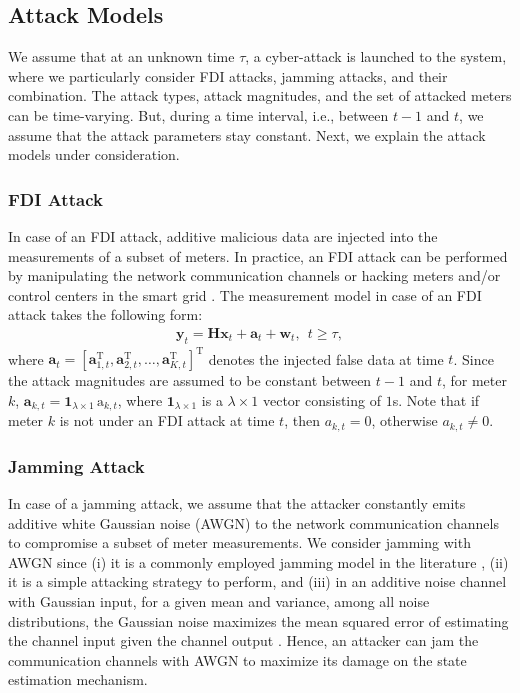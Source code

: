 \documentclass[onecolumn]{IEEEtran}
\begin{document}
\subsection{Attack Models}

We assume that at an unknown time $\tau$, a cyber-attack is launched to the system, where we particularly consider FDI attacks, jamming attacks, and their combination. The attack types, attack magnitudes, and the set of attacked meters can be time-varying. But, during a time interval, i.e., between $t-1$ and $t$, we assume that the attack parameters stay constant. Next, we explain the attack models under consideration.

\subsubsection{FDI Attack}

In case of an FDI attack, additive malicious data are injected into the measurements of a subset of meters. In practice, an FDI attack can be performed by manipulating the network communication channels or hacking meters and/or control centers in the smart grid \cite{Liang16,GLiang17}. The measurement model in case of an FDI attack takes the following form:
\begin{gather} \label{eq:fdi_model}
\mathbf{y}_t = \mathbf{H} \mathbf{x}_t + \mathbf{a}_t + \mathbf{w}_t, ~~ t \geq \tau,
\end{gather}
where $\mathbf{a}_t = [\mathbf{a}_{1,t}^\mathrm{T}, \mathbf{a}_{2,t}^\mathrm{T}, \dots, \mathbf{a}_{K,t}^\mathrm{T}]^\mathrm{T}$ denotes the injected false data at time $t$. Since the attack magnitudes are assumed to be constant between $t-1$ and $t$, for meter $k$, $\mathbf{a}_{k,t} = \mathbf{1}_{\lambda \times 1} \, \mathrm{a}_{k,t}$, where $\mathbf{1}_{\lambda \times 1}$ is a $\lambda \times 1$ vector consisting of $1$s. Note that if meter $k$ is not under an FDI attack at time $t$, then $a_{k,t} = 0$, otherwise $a_{k,t} \neq 0$.

\subsubsection{Jamming Attack}

In case of a jamming attack, we assume that the attacker constantly emits additive white Gaussian noise (AWGN) to the network communication channels to compromise a subset of meter measurements. We consider jamming with AWGN since (i) it is a commonly employed jamming model in the literature \cite{JGao15,Gezici16}, (ii) it is a simple attacking strategy to perform, and (iii) in an additive noise channel with Gaussian input, for a given mean and variance, among all noise distributions, the Gaussian noise maximizes the mean squared error of estimating the channel input given the channel output \cite{Kay93,Gezici16}. Hence, an attacker can jam the communication channels with AWGN to maximize its damage on the state estimation mechanism.
\end{document}
